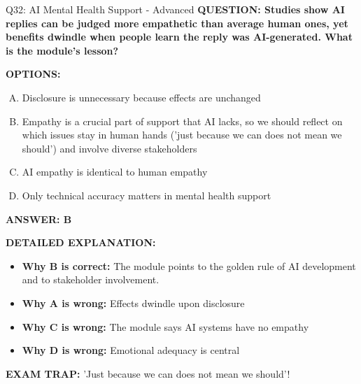 \documentclass[8pt]{beamer}
\begin{document}
\begin{frame}[shrink=6]{Q32: AI Mental Health Support - Advanced}
\fontsize{6.5}{7.5}\selectfont
\textbf{QUESTION: Studies show AI replies can be judged more empathetic than average human ones, yet benefits dwindle when people learn the reply was AI-generated. What is the module's lesson?}

\vspace{0.1cm}
\textbf{OPTIONS:}
\begin{enumerate}[A.]
\item Disclosure is unnecessary because effects are unchanged
\item Empathy is a crucial part of support that AI lacks, so we should reflect on which issues stay in human hands ('just because we can does not mean we should') and involve diverse stakeholders
\item AI empathy is identical to human empathy
\item Only technical accuracy matters in mental health support
\end{enumerate}

\vspace{0.1cm}
\textcolor{myblue}{\textbf{ANSWER: B}}

\vspace{0.1cm}
\textbf{DETAILED EXPLANATION:}
\begin{itemize}
\item \textbf{Why B is correct:} The module points to the golden rule of AI development and to stakeholder involvement.
\item \textbf{Why A is wrong:} Effects dwindle upon disclosure
\item \textbf{Why C is wrong:} The module says AI systems have no empathy
\item \textbf{Why D is wrong:} Emotional adequacy is central
\end{itemize}

\textcolor{myred}{\textbf{EXAM TRAP:}} 'Just because we can does not mean we should'!
\end{frame}

\end{document}
